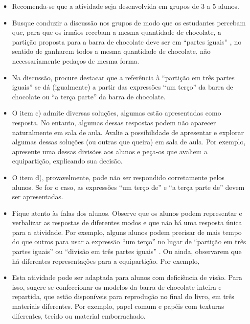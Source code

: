\begin{multicols}{2}
  \begin{itemize} %
    \item       Recomenda-se que a atividade seja desenvolvida em grupos de 3 a 5 alunos.
    \item       Busque conduzir a discussão nos grupos de modo que os estudantes percebam que, para que os irmãos recebam a mesma quantidade de chocolate, a partição proposta para a barra de chocolate deve ser em       ``partes iguais''      , no sentido de ganharem todos a mesma quantidade de chocolate, não necessariamente pedaços de mesma forma.
    \item       Na discussão, procure destacar que a referência à       ``partição em três partes iguais''       se dá (igualmente) a partir das expressões       ``um terço''       da barra de chocolate ou       ``a terça parte''       da barra de chocolate.
    \item       O item c) admite diversas soluções, algumas estão apresentadas como resposta. No entanto, algumas dessas respostas podem não aparecer naturalmente em sala de aula. Avalie a possibilidade de apresentar e explorar algumas dessas soluções (ou outras que queira) em sala de aula. Por exemplo, apresente uma dessas divisões aos alunos e peça-os que avaliem a equipartição, explicando sua decisão.
    \item       O item d), provavelmente, pode não ser respondido corretamente pelos alunos. Se for o caso, as expressões ``um terço de'' e ``a terça parte de'' devem ser apresentadas.
    \item       Fique atento às falas dos alunos. Observe que os alunos podem representar e verbalizar as respostas de diferentes modos e que não há uma resposta única para a atividade. Por exemplo, alguns alunos podem precisar de mais tempo do que outros para usar a expressão       ``um terço''       no lugar de       ``partição em três partes iguais''       ou       ``divisão em três partes iguais''      . Ou ainda, observarem que há diferentes representações para a equipartição. Por exemplo,
\end{itemize} %


\begin{itemize} %
    \item       Esta atividade pode ser adaptada para alunos com deficiência de visão. Para isso, sugere-se confeccionar os modelos da barra de chocolate  inteira e repartida, que estão disponíveis para reprodução no final do livro, em três materiais diferentes. Por exemplo, papel comum e papéis com texturas diferentes, tecido ou material emborrachado.
\end{itemize} %


\end{multicols}
